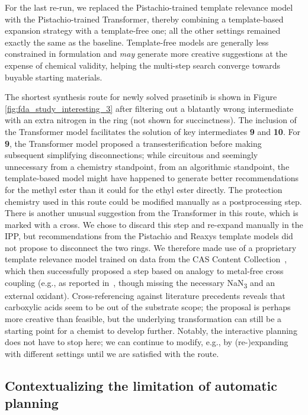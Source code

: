 \documentclass[pdflatex,sn-mathphys-num]{sn-jnl}%
\theoremstyle{thmstyleone}%
\theoremstyle{thmstyletwo}%
\theoremstyle{thmstylethree}%
\begin{document}
\clearpage

For the last re-run, we replaced the Pistachio-trained template relevance model with the Pistachio-trained Transformer, thereby combining a template-based expansion strategy with a template-free one; all the other settings remained exactly the same as the baseline. Template-free models are generally less constrained in formulation and \emph{may} generate more creative suggestions at the expense of chemical validity, helping the multi-step search converge towards buyable starting materials.

The shortest synthesis route for newly solved prasetinib is shown in Figure \ref{fig:fda_study_interesting_3} after filtering out a blatantly wrong intermediate with an extra nitrogen in the ring (not shown for succinctness). The inclusion of the Transformer model facilitates the solution of key intermediates \textbf{9} and \textbf{10}. For \textbf{9}, the Transformer model proposed a transesterification before making subsequent simplifying disconnections; while circuitous and seemingly unnecessary from a chemistry standpoint, from an algorithmic standpoint, the template-based model might have happened to generate better recommendations for the methyl ester than it could for the ethyl ester directly. The protection chemistry used in this route could be modified manually as a postprocessing step. There is another unusual suggestion from the Transformer in this route, which is marked with a cross. We chose to discard this step and re-expand manually in the IPP, but recommendations from the Pistachio and Reaxys template models did not propose to disconnect the two rings. We therefore made use of a proprietary template relevance model trained on data from the CAS Content Collection~\citep{CASContent}, which then successfully proposed a step based on analogy to metal-free cross coupling (e.g., as reported in~\citep{antonchick_direct_2013}, though missing the necessary NaN\textsubscript{3} and an external oxidant). Cross-referencing against literature precedents reveals that carboxylic acids seem to be out of the substrate scope; the proposal is perhaps more creative than feasible, but the underlying transformation can still be a starting point for a chemist to develop further. Notably, the interactive planning does not have to stop here; we can continue to modify, e.g., by (re-)expanding with different settings until we are satisfied with the route.

\subsection{Contextualizing the limitation of automatic planning}
\end{document}
